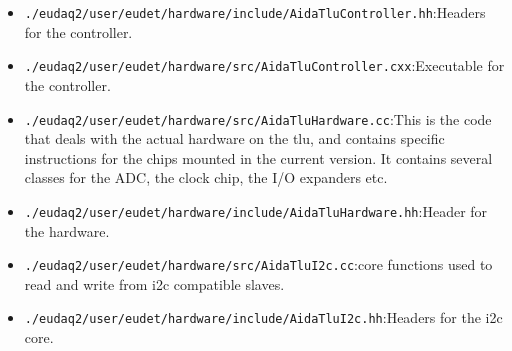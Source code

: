 \begin{itemize}
  \item \verb|./eudaq2/user/eudet/hardware/include/AidaTluController.hh|:\newline Headers for the controller.
  \item \verb|./eudaq2/user/eudet/hardware/src/AidaTluController.cxx|:\newline Executable for the controller.
  \item \verb|./eudaq2/user/eudet/hardware/src/AidaTluHardware.cc|:\newline This is the code that deals with the actual hardware on the \gls{tlu}, and contains specific instructions for the chips mounted in the current version. It contains several classes for the ADC, the clock chip, the I/O expanders etc.
  \item \verb|./eudaq2/user/eudet/hardware/include/AidaTluHardware.hh|:\newline Header for the hardware.
  \item \verb|./eudaq2/user/eudet/hardware/src/AidaTluI2c.cc|:\newline core functions used to read and write from \gls{i2c} compatible slaves.
  \item \verb|./eudaq2/user/eudet/hardware/include/AidaTluI2c.hh|:\newline Headers for the \gls{i2c} core.
\end{itemize}

